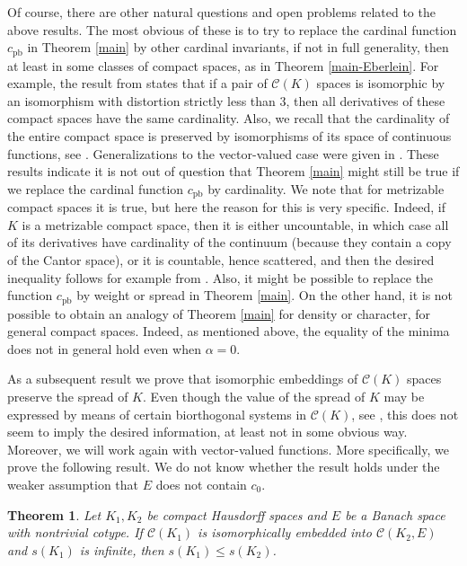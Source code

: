 \documentclass{amsart}
\numberwithin{equation}{section}
\newtheorem{thm}{Theorem}[section]
\theoremstyle{definition}
\def\C{\mathcal C}
\begin{document}
Of course, there are other natural questions and open problems related to the above results. The most obvious of these is to try to replace the cardinal function $c_{\text{pb}}$ in Theorem \ref{main} by other cardinal invariants, if not in full generality, then at least in some classes of compact spaces, as in Theorem \ref{main-Eberlein}. For example, the result from \cite{Gordon3} states that if a pair of $\C(K)$ spaces is isomorphic by an isomorphism with distortion strictly less than $3$, then all derivatives of these compact spaces have the same cardinality. Also, we recall that the cardinality of the entire compact space is preserved by isomorphisms of its space of continuous functions, see \cite{cengiz}. Generalizations to the vector-valued case were given in \cite{GalegoVillamizar}. These results indicate it is not out of question that Theorem \ref{main} might still be true if we replace the cardinal function $c_{\text{pb}}$ by cardinality. We note that for metrizable compact spaces it is true, but here the reason for this is very specific. Indeed, if $K$ is a metrizable compact space, then it is either uncountable, in which case all of its derivatives have cardinality of the continuum (because they contain a copy of the Cantor space), or it is countable, hence scattered, and then the desired inequality follows for example from \cite{rondos-somaglia}.
Also, it might be possible to replace the function $c_{\text{pb}}$ by weight or spread in Theorem \ref{main}. On the other hand, it is not possible to obtain an analogy of Theorem \ref{main} for density or character, for general compact spaces. Indeed, as mentioned above, the equality of the minima does not in general hold even when $\alpha=0$.

As a subsequent result we prove that isomorphic embeddings of $\C(K)$ spaces preserve the spread of $K$. Even though the value of the spread of $K$ may be expressed by means of certain biorthogonal systems in $\C(K)$, see \cite[Proposition 3.2]{Koszmider_biorthogonal}, this does not seem to imply the desired information, at least not in some obvious way. Moreover, we will work again with vector-valued functions. More specifically, we prove the following result. We do not know whether the result holds under the weaker assumption that $E$ does not contain $c_0$.

\begin{thm}
\label{spread}
Let $K_1, K_2$ be compact Hausdorff spaces and $E$ be a Banach space with nontrivial cotype. If $\C(K_1)$ is isomorphically embedded into $\C(K_2, E)$ and $s(K_1)$ is infinite, then $s(K_1) \leq s(K_2)$.
\end{thm}
\end{document}
